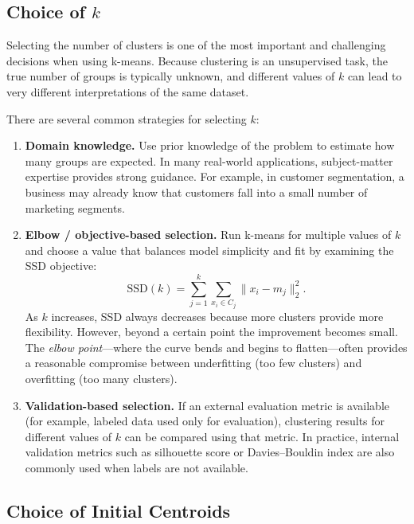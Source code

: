 \documentclass{article}
\begin{document}
\subsection{Choice of $k$}

Selecting the number of clusters is one of the most important and challenging
decisions when using k-means. Because clustering is an unsupervised task, the
true number of groups is typically unknown, and different values of $k$ can lead
to very different interpretations of the same dataset.

There are several common strategies for selecting $k$:

\begin{enumerate}
    \item \textbf{Domain knowledge.}
    Use prior knowledge of the problem to estimate how many groups are expected.
    In many real-world applications, subject-matter expertise provides strong
    guidance. For example, in customer segmentation, a business may already know
    that customers fall into a small number of marketing segments.

    \item \textbf{Elbow / objective-based selection.}
    Run k-means for multiple values of $k$ and choose a value that balances model
    simplicity and fit by examining the SSD objective:
    \[
    \mathrm{SSD}(k) = \sum_{j=1}^k \sum_{x_i \in C_j} \|x_i - m_j\|_2^2.
    \]
    As $k$ increases, SSD always decreases because more clusters provide more
    flexibility. However, beyond a certain point the improvement becomes small.
    The \emph{elbow point}—where the curve bends and begins to flatten—often
    provides a reasonable compromise between underfitting (too few clusters)
    and overfitting (too many clusters).

    \item \textbf{Validation-based selection.}
    If an external evaluation metric is available (for example, labeled data used
    only for evaluation), clustering results for different values of $k$ can be
    compared using that metric. In practice, internal validation metrics such as
    silhouette score or Davies–Bouldin index are also commonly used when labels
    are not available.
\end{enumerate}

\subsection{Choice of Initial Centroids}
\end{document}
